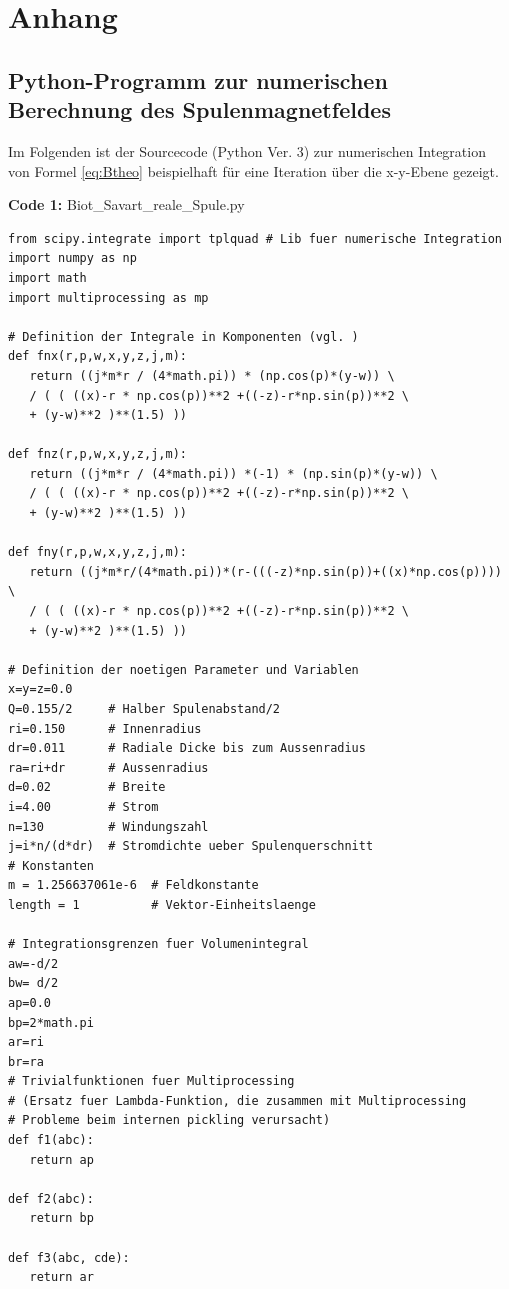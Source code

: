 \documentclass[12pt,a4paper]{article}
\begin{document}
\section{Anhang}
\begin{singlespace}
\subsection{Python-Programm zur numerischen Berechnung des Spulenmagnetfeldes}
\label{ch:code}
Im Folgenden ist der Sourcecode (Python Ver. 3) zur numerischen Integration von Formel \ref{eq:Btheo} beispielhaft für eine Iteration über die x-y-Ebene gezeigt.
\begin{center}
	\textbf{Code 1:} Biot\_Savart\_reale\_Spule.py
\end{center}
\begin{lstlisting}
from scipy.integrate import tplquad # Lib fuer numerische Integration
import numpy as np
import math
import multiprocessing as mp

# Definition der Integrale in Komponenten (vgl. )
def fnx(r,p,w,x,y,z,j,m):
   return ((j*m*r / (4*math.pi)) * (np.cos(p)*(y-w)) \
   / ( ( ((x)-r * np.cos(p))**2 +((-z)-r*np.sin(p))**2 \
   + (y-w)**2 )**(1.5) ))

def fnz(r,p,w,x,y,z,j,m):
   return ((j*m*r / (4*math.pi)) *(-1) * (np.sin(p)*(y-w)) \
   / ( ( ((x)-r * np.cos(p))**2 +((-z)-r*np.sin(p))**2 \ 
   + (y-w)**2 )**(1.5) ))

def fny(r,p,w,x,y,z,j,m):
   return ((j*m*r/(4*math.pi))*(r-(((-z)*np.sin(p))+((x)*np.cos(p)))) \ 
   / ( ( ((x)-r * np.cos(p))**2 +((-z)-r*np.sin(p))**2 \
   + (y-w)**2 )**(1.5) ))

# Definition der noetigen Parameter und Variablen
x=y=z=0.0
Q=0.155/2     # Halber Spulenabstand/2
ri=0.150      # Innenradius
dr=0.011      # Radiale Dicke bis zum Aussenradius
ra=ri+dr      # Aussenradius
d=0.02        # Breite
i=4.00        # Strom
n=130         # Windungszahl
j=i*n/(d*dr)  # Stromdichte ueber Spulenquerschnitt
# Konstanten 
m = 1.256637061e-6  # Feldkonstante
length = 1          # Vektor-Einheitslaenge

# Integrationsgrenzen fuer Volumenintegral
aw=-d/2 
bw= d/2
ap=0.0
bp=2*math.pi 
ar=ri
br=ra
# Trivialfunktionen fuer Multiprocessing
# (Ersatz fuer Lambda-Funktion, die zusammen mit Multiprocessing
# Probleme beim internen pickling verursacht)
def f1(abc):
   return ap

def f2(abc):
   return bp

def f3(abc, cde):
   return ar


\end{lstlisting}
\end{singlespace}
\end{document}
